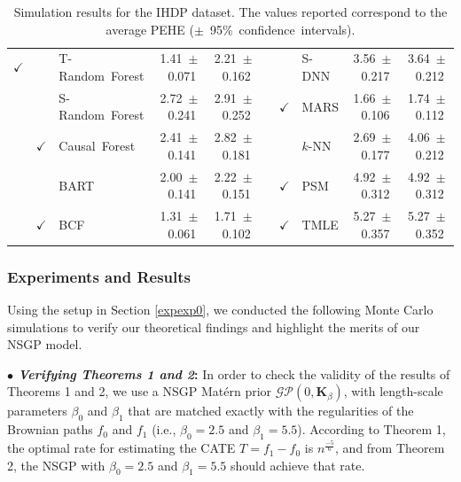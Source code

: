 \documentclass [PhD] {uclathes}
\begin{document}
\begin{table}[t]
\begin{tabular}{|cc|l||c|c|cc|l||c|c|}
\mbox{\footnotesize $\boldsymbol{\checkmark}$} & & \mbox{\tiny T-Random Forest} & \mbox{\tiny 1.41 $\pm$ 0.071} & \mbox{\tiny 2.21 $\pm$ 0.162} & & & \mbox{\tiny S-DNN} & \mbox{\tiny 3.56 $\pm$ 0.217} & \mbox{\tiny 3.64 $\pm$ 0.212} \\
& & \mbox{\tiny S-Random Forest} & \mbox{\tiny 2.72 $\pm$ 0.241} & \mbox{\tiny 2.91 $\pm$ 0.252} & & \mbox{\footnotesize $\boldsymbol{\checkmark}$} & \mbox{\tiny MARS} & \mbox{\tiny 1.66 $\pm$ 0.106} & \mbox{\tiny 1.74 $\pm$ 0.112} \\
 & \mbox{\footnotesize $\checkmark$} & \mbox{\tiny Causal Forest} & \mbox{\tiny 2.41 $\pm$ 0.141} & \mbox{\tiny 2.82 $\pm$ 0.181} & & & \mbox{\tiny $k$-NN} & \mbox{\tiny 2.69 $\pm$ 0.177} & \mbox{\tiny 4.06 $\pm$ 0.212} \\
& & \mbox{\tiny BART} & \mbox{\tiny 2.00 $\pm$ 0.141} & \mbox{\tiny 2.22 $\pm$ 0.151} & & \mbox{\footnotesize $\boldsymbol{\checkmark}$} & \mbox{\tiny PSM} & \mbox{\tiny 4.92 $\pm$ 0.312} & \mbox{\tiny 4.92 $\pm$ 0.312} \\
& \mbox{\footnotesize $\boldsymbol{\checkmark}$} & \mbox{\tiny BCF} & \mbox{\tiny 1.31 $\pm$ 0.061} & \mbox{\tiny 1.71 $\pm$ 0.102} & & \mbox{\footnotesize $\boldsymbol{\checkmark}$} & \mbox{\tiny TMLE} & \mbox{\tiny 5.27 $\pm$ 0.357} & \mbox{\tiny 5.27 $\pm$ 0.352} \\
\hline
\end{tabular}
\caption{Simulation results for the IHDP dataset. The values reported correspond to the average PEHE (\mbox{\footnotesize $\pm$ 95$\%$ confidence intervals}).}
\label{TableCh1}
\end{table}


\subsubsection{Experiments and Results}  
\label{expexp}
Using the setup in Section \ref{expexp0}, we conducted the following Monte Carlo simulations to verify our theoretical findings and highlight the merits of our NSGP model. 	

\textbf{$\bullet$ \textit{Verifying Theorems 1 and 2}:} In order to check the validity of the results of Theorems 1 and 2, we use a NSGP Mat\'ern prior $\mathcal{GP}(0,\boldsymbol{K}_{\beta})$, with length-scale parameters $\beta_0$ and $\beta_1$ that are matched exactly with the regularities of the Brownian paths $f_0$ and $f_1$ (i.e., $\beta_0 = 2.5$ and $\beta_1 = 5.5$). According to Theorem 1, the optimal rate for estimating the CATE $T = f_1 - f_0$ is $n^{\frac{-5}{6}}$, and from Theorem 2, the NSGP with $\beta_0 = 2.5$ and $\beta_1 = 5.5$ should achieve that rate. 
\end{document}

